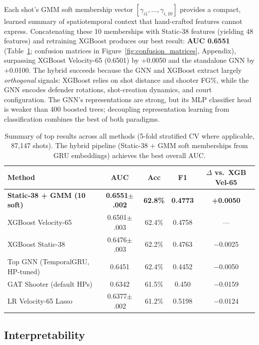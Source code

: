 \documentclass{article}
\begin{document}
Each shot's GMM soft membership vector $[\gamma_{i1}, \ldots, \gamma_{i,10}]$ provides a compact, learned summary of spatiotemporal context that hand-crafted features cannot express. Concatenating these 10 memberships with Static-38 features (yielding 48 features) and retraining XGBoost produces our best result: \textbf{AUC 0.6551} (Table~\ref{tab:hybrid_results}; confusion matrices in Figure~\ref{fig:confusion_matrices}, Appendix), surpassing XGBoost Velocity-65 (0.6501) by +0.0050 and the standalone GNN by +0.0100. The hybrid succeeds because the GNN and XGBoost extract largely \emph{orthogonal} signals: XGBoost relies on shot distance and shooter FG\%, while the GNN encodes defender rotations, shot-creation dynamics, and court configuration. The GNN's representations are strong, but its MLP classifier head is weaker than 400 boosted trees; decoupling representation learning from classification combines the best of both paradigms.

\begin{table}[t]
\centering
\caption{Summary of top results across all methods (5-fold stratified CV where applicable, 87,147 shots). The hybrid pipeline (Static-38 + GMM soft memberships from GRU embeddings) achieves the best overall AUC.}
\label{tab:hybrid_results}
\small
\begin{tabular}{@{}lcccc@{}}
\toprule
\textbf{Method} & \textbf{AUC} & \textbf{Acc} & \textbf{F1} & \textbf{$\Delta$ vs.\ XGB Vel-65} \\
\midrule
\textbf{Static-38 + GMM (10 soft)} & \textbf{0.6551{\tiny$\pm$.002}} & \textbf{62.8\%} & \textbf{0.4773} & \textbf{+0.0050} \\
XGBoost Velocity-65 & 0.6501{\tiny$\pm$.003} & 62.4\% & 0.4758 & --- \\
XGBoost Static-38 & 0.6476{\tiny$\pm$.003} & 62.2\% & 0.4763 & $-$0.0025 \\
Top GNN (TemporalGRU, HP-tuned) & 0.6451 & 62.4\% & 0.4452 & $-$0.0050 \\
GAT Shooter (default HPs) & 0.6342 & 61.5\% & 0.450 & $-$0.0159 \\
LR Velocity-65 Lasso & 0.6377{\tiny$\pm$.002} & 61.2\% & 0.5198 & $-$0.0124 \\
\bottomrule
\end{tabular}
\end{table}

\subsection{Interpretability}
\end{document}
